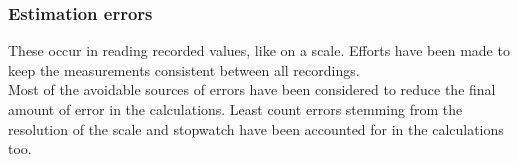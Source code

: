 \documentclass{article}
\begin{document}
\begin{sloppypar}
\subsubsection{Estimation errors}
These occur in reading recorded values, like on a scale. Efforts have been made to keep the measurements consistent between all recordings. \\
\vspace{5mm}
Most of the avoidable sources of errors have been considered to reduce the final amount of error in the calculations. Least count errors stemming from the resolution of the scale and stopwatch have been accounted for in the calculations too.
\end{sloppypar}
\end{document}
